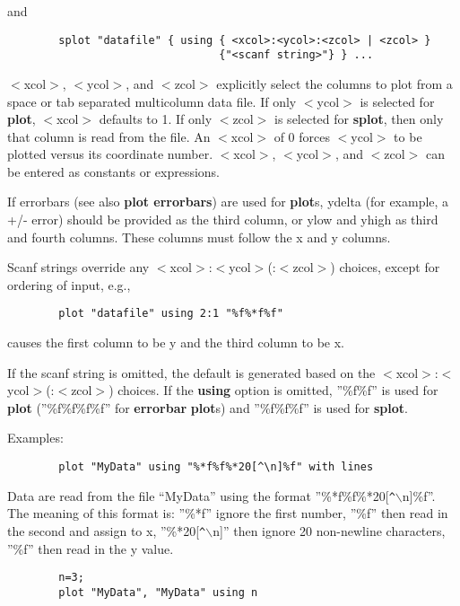 and

\begin{verbatim}
        splot "datafile" { using { <xcol>:<ycol>:<zcol> | <zcol> }
                                 {"<scanf string>"} } ...
\end{verbatim}

$<$xcol$>$, $<$ycol$>$, and $<$zcol$>$ explicitly select the columns to plot from
a space or tab separated multicolumn data file. If only $<$ycol$>$ is
selected for {\bf plot}, $<$xcol$>$ defaults to 1. If only $<$zcol$>$ is selected
for {\bf splot}, then only that column is read from the file. An $<$xcol$>$ of
0 forces $<$ycol$>$ to be plotted versus its coordinate number. $<$xcol$>$,
$<$ycol$>$, and $<$zcol$>$ can be entered as constants or expressions.

If errorbars (see also {\bf plot errorbars}) are used for {\bf plot}s,
ydelta (for example, a +/- error) should be provided as the third
column, or ylow and yhigh as third and fourth columns.  These columns
must follow the x and y columns.

Scanf strings override any $<$xcol$>$:$<$ycol$>$(:$<$zcol$>$) choices, except for
ordering of input, e.g.,
\begin{verbatim}
        plot "datafile" using 2:1 "%f%*f%f"
\end{verbatim}
causes the first column to be y and the third column to be x.

If the scanf string is omitted, the default is generated based on the
$<$xcol$>$:$<$ycol$>$(:$<$zcol$>$) choices. If the {\bf using} option is omitted, ''\%f\%f''
is used for {\bf plot} (''\%f\%f\%f\%f'' for {\bf errorbar} {\bf plot}s) and ''\%f\%f\%f'' is
used for {\bf splot}.

Examples:

\begin{verbatim}
        plot "MyData" using "%*f%f%*20[^\n]%f" with lines
\end{verbatim}

Data are read from the file ``MyData'' using the format
''\%*f\%f\%*20[\verb+^+$\backslash$n]\%f''. The meaning of this format is: ''\%*f'' ignore the
first number, ''\%f'' then read in the second and assign to x,
''\%*20[\verb+^+$\backslash$n]'' then ignore 20 non-newline characters, ''\%f'' then read in
the y value.

\begin{verbatim}
        n=3;
        plot "MyData", "MyData" using n 
\end{verbatim}

